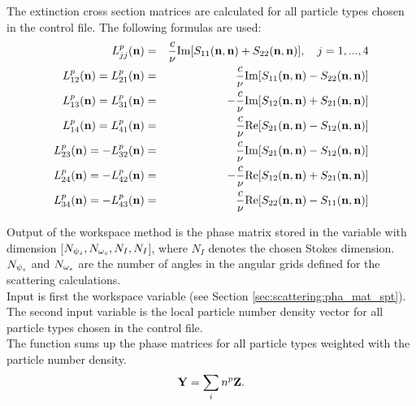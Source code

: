 The extinction cross section matrices \SExMat{} are calculated for all
particle types chosen in the control file. The following formulas are
used:
\begin{eqnarray}
  \label{eq:gen_ext_matrix}
  L^p_{jj}({\bf n}) &=& \frac{c}{\nu} \Im[S_{11}({\bf n},{\bf
    n})+S_{22}({\bf n},{\bf n})], \quad j=1,...,4 \\
  L^p_{12}({\bf n}) = L^p_{21}({\bf n}) &=& \frac{c}{\nu} \Im[S_{11}({\bf n},{\bf
    n})-S_{22}({\bf n},{\bf n})]\\
  L^p_{13}({\bf n}) = L^p_{31}({\bf n}) &=& -\frac{c}{\nu} \Im[S_{12}({\bf n},{\bf
    n})+S_{21}({\bf n},{\bf n})]\\
  L^p_{14}({\bf n}) = L^p_{41}({\bf n}) &=& \frac{c}{\nu} \Re[S_{21}({\bf n},{\bf
    n})-S_{12}({\bf n},{\bf n})]\\
  L^p_{23}({\bf n}) = -L^p_{32}({\bf n}) &=& \frac{c}{\nu} \Im[S_{21}({\bf n},{\bf
    n})-S_{12}({\bf n},{\bf n})]\\
  L^p_{24}({\bf n}) = -L^p_{42}({\bf n}) &=& -\frac{c}{\nu} \Re[S_{12}({\bf n},{\bf
    n})+S_{21}({\bf n},{\bf n})]\\
  L^p_{34}({\bf n}) = -L^p_{43}({\bf n}) &=& \frac{c}{\nu} \Re[S_{22}({\bf n},{\bf
    n})-S_{11}({\bf n},{\bf n})]
\end{eqnarray}


\label{sec:scattering:tot_pha_mat}

\label{sec:scattering:pha_mat}

Output of the workspace method  is the phase
matrix stored in the variable   with dimension
[$N_{{\psi_s}}, N_{{\omega_s}}, N_{I}, N_{I}$], where $N_{I}$ denotes the
chosen Stokes dimension.  $N_{{\psi_s}}$ and 
$N_{{\omega_s}}$ are the number of angles in the angular grids defined for
the scattering calculations.\\
Input is first the workspace variable  (see Section
\ref{sec:scattering:pha_mat_spt}). The second input variable is the
local particle number density vector  for all
particle types chosen in the control file.\\
The function sums up the phase matrices for all particle types
weighted with the particle number density.
\begin{eqnarray}
{\bf Y} = \sum_i{n^p{\bf Z}}.
\end{eqnarray}

